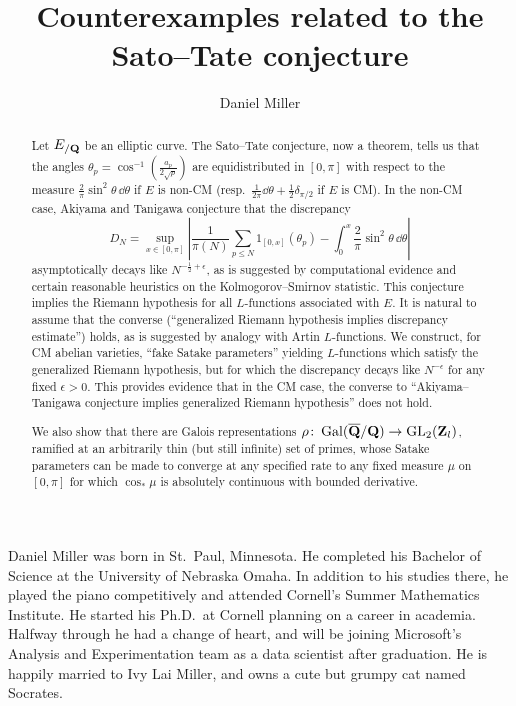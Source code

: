 \documentclass[phd,tocprelim]{cornell}
\title{Counterexamples related to the Sato--Tate conjecture}
\author{Daniel Miller}
\begin{document}
\maketitle
\makecopyright





\begin{abstract}
Let $E_{/\mathbf{Q}}$ be an elliptic curve. The Sato--Tate conjecture, now a theorem, 
tells us that the angles $\theta_p =\cos^{-1}\left(\frac{a_p}{2\sqrt p}\right)$ 
are equidistributed in $[0,\pi]$ with respect to the measure 
$\frac{2}{\pi}\sin^2\theta\, \dd\theta$ if $E$ is non-CM
(resp.~$\frac{1}{2\pi} \dd \theta + \frac 1 2 \delta_{\pi/2}$ if $E$ is CM). 
In the non-CM case, Akiyama and Tanigawa conjecture that the discrepancy 
\[
	D_N = \sup_{x\in [0,\pi]} \left| \frac{1}{\pi(N)} \sum_{p\leqslant N} 1_{[0,x]}(\theta_p) - \int_0^x \frac{2}{\pi}\sin^2\theta\, \dd\theta\right| 
\]
asymptotically decays like $N^{-\frac 1 2+\epsilon}$, as is suggested by computational 
evidence and certain reasonable heuristics on the Kolmogorov--Smirnov 
statistic. This conjecture implies the Riemann hypothesis 
for all $L$-functions associated with $E$. It is natural to assume that the 
converse (``generalized Riemann hypothesis implies discrepancy estimate'') holds, 
as is suggested by analogy with Artin $L$-functions. We construct, for CM abelian 
varieties, ``fake Satake parameters'' yielding $L$-functions which satisfy 
the generalized Riemann hypothesis, but for which the discrepancy decays like 
$N^{-\epsilon}$ for any fixed $\epsilon>0$. This provides evidence that in the 
CM case, the converse to ``Akiyama--Tanigawa conjecture implies generalized 
Riemann hypothesis'' does not hold. 

We also show that there are Galois representations 
$\rho\colon \operatorname{Gal}(\overline {\mathbf{Q}} /\mathbf{Q}) \to \operatorname{GL}_2(\mathbf{Z}_l)$, ramified at an 
arbitrarily thin (but still infinite) set of primes, whose Satake parameters 
can be made to converge at any specified rate to any fixed measure $\mu$ on 
$[0,\pi]$ for which $\cos_\ast\mu$ is absolutely continuous with bounded 
derivative. 
\end{abstract}





\begin{biosketch}
Daniel Miller was born in St.~Paul, Minnesota. He completed his Bachelor of 
Science at the University of Nebraska Omaha. In addition to his studies there, 
he played the piano competitively and attended Cornell's Summer Mathematics 
Institute. He started his Ph.D.~at Cornell planning on a career in academia. 
Halfway through he had a change of heart, and will be joining Microsoft's 
Analysis and Experimentation team as a data scientist after graduation. He is 
happily married to Ivy Lai Miller, and owns a cute but grumpy cat named Socrates. 
\end{biosketch}
\end{document}
